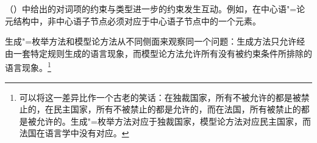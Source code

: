 
（）中给出的对词项的约束与类型进一步的约束发生互动。例如，在中心语"=论元结构中，非中心语子节点必须对应于中心语子节点\subcatlc 中的一个元素。

生成"=枚举方法和模型论方法从不同侧面来观察同一个问题：生成方法只允许经由一套特定规则生成的语言现象，而模型论方法允许所有没有被约束条件所排除的语言现象。\footnote{%
可以将这一差异比作一个古老的笑话：在独裁国家，所有不被允许的都是被禁止的，在民主国家，所有不被禁止的都是允许的，而在法国，所有被禁止的都是被允许的。生成"=枚举方法对应于独裁国家，模型论方法对应民主国家，而法国在语言学中没有对应。
}

